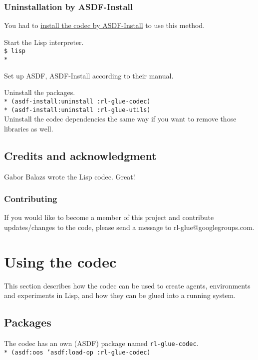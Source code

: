 \documentclass[11pt,a4paper,dvipdfm]{article}
\newcommand{\prompttext}[1]{\texttt{#1}}
\newcommand{\shprompt}[1]{\prompttext{\$ #1}}
\newcommand{\lispprompt}[1]{\prompttext{* #1}}
\begin{document}
\subsubsection{Uninstallation by ASDF-Install}

You had to \hyperlink{asdfinst}{install the codec by ASDF-Install} to use this
method.

Start the Lisp interpreter. \\
\shprompt{lisp} \\
\lispprompt{}

Set up ASDF, ASDF-Install according to their manual.

Uninstall the packages. \\
\lispprompt{(asdf-install:uninstall :rl-glue-codec)} \\
\lispprompt{(asdf-install:uninstall :rl-glue-utils)} \\
Uninstall the codec dependencies the same way if you want to remove those
libraries as well.

\subsection{Credits and acknowledgment}

Gabor Balazs wrote the Lisp codec. Great!

\subsubsection{Contributing}

If you would like to become a member of this project and contribute 
updates/changes to the code, please send a message to rl-glue@googlegroups.com.


\section{Using the codec}

This section describes how the codec can be used to create agents, environments
and experiments in Lisp, and how they can be glued into a running system.

\subsection{Packages}

The codec has an own (ASDF) package named \prompttext{rl-glue-codec}. \\
\lispprompt{(asdf:oos 'asdf:load-op :rl-glue-codec)}
\end{document}

